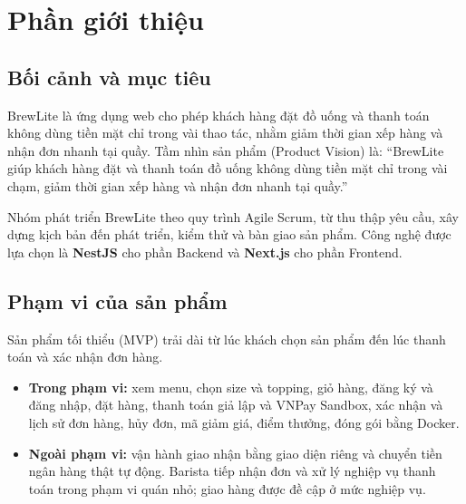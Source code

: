 \documentclass[a4paper]{article}
\begin{document}
\thispagestyle{empty}

\newpage
\tableofcontents
\newpage

\section{Phần giới thiệu}
\subsection{Bối cảnh và mục tiêu}
BrewLite là ứng dụng web cho phép khách hàng đặt đồ uống và thanh toán không dùng tiền mặt chỉ trong vài thao tác, nhằm giảm thời gian xếp hàng và nhận đơn nhanh tại quầy. Tầm nhìn sản phẩm (Product Vision) là: ``BrewLite giúp khách hàng đặt và thanh toán đồ uống không dùng tiền mặt chỉ trong vài chạm, giảm thời gian xếp hàng và nhận đơn nhanh tại quầy.''

Nhóm phát triển BrewLite theo quy trình Agile Scrum, từ thu thập yêu cầu, xây dựng kịch bản đến phát triển, kiểm thử và bàn giao sản phẩm. Công nghệ được lựa chọn là \textbf{NestJS} cho phần Backend và \textbf{Next.js} cho phần Frontend.

\subsection{Phạm vi của sản phẩm}
Sản phẩm tối thiểu (MVP) trải dài từ lúc khách chọn sản phẩm đến lúc thanh toán và xác nhận đơn hàng.
\begin{itemize}
	\item \textbf{Trong phạm vi:} xem menu, chọn size và topping, giỏ hàng, đăng ký và đăng nhập, đặt hàng, thanh toán giả lập và VNPay Sandbox, xác nhận và lịch sử đơn hàng, hủy đơn, mã giảm giá, điểm thưởng, đóng gói bằng Docker.
	\item \textbf{Ngoài phạm vi:} vận hành giao nhận bằng giao diện riêng và chuyển tiền ngân hàng thật tự động. Barista tiếp nhận đơn và xử lý nghiệp vụ thanh toán trong phạm vi quán nhỏ; giao hàng được đề cập ở mức nghiệp vụ.
\end{itemize}
\end{document}

